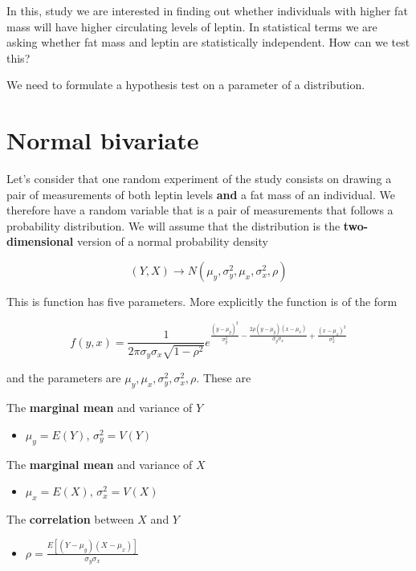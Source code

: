 \documentclass[
]{book}
\providecommand{\tightlist}{%
  \setlength{\itemsep}{0pt}\setlength{\parskip}{0pt}}
\begin{document}
In this, study we are interested in finding out whether individuals with higher fat mass will have higher circulating levels of leptin. In statistical terms we are asking whether fat mass and leptin are statistically independent. How can we test this?

We need to formulate a hypothesis test on a parameter of a distribution.

\hypertarget{normal-bivariate}{%
\section{Normal bivariate}\label{normal-bivariate}}

Let's consider that one random experiment of the study consists on drawing a pair of measurements of both leptin levels \textbf{and} a fat mass of an individual. We therefore have a random variable that is a pair of measurements that follows a probability distribution. We will assume that the distribution is the \textbf{two-dimensional} version of a normal probability density

\[(Y, X) \rightarrow N(\mu_y, \sigma^2_y, \mu_x, \sigma^2_x, \rho)\]

This is function has five parameters. More explicitly the function is of the form

\[f(y,x)=\frac{1}{2\pi \sigma_y\sigma_x \sqrt{1-\rho^2}}e^{\frac{(y-\mu_y)^2}{\sigma_y^2}-\frac{2\rho(y-\mu_y)(x-\mu_x)}{\sigma_y\sigma_x}+\frac{(x-\mu_x)^2}{\sigma_x^2}}\]

and the parameters are \(\mu_y, \mu_x, \sigma^2_y, \sigma_x^2, \rho\). These are

The \textbf{marginal mean} and variance of \(Y\)

\begin{itemize}
\tightlist
\item
  \(\mu_y=E(Y)\), \(\sigma^2_y=V(Y)\)
\end{itemize}

The \textbf{marginal mean} and variance of \(X\)

\begin{itemize}
\tightlist
\item
  \(\mu_x=E(X)\), \(\sigma^2_x=V(X)\)
\end{itemize}

The \textbf{correlation} between \(X\) and \(Y\)

\begin{itemize}
\tightlist
\item
  \(\rho=\frac{E[(Y-\mu_y)(X-\mu_x)]}{\sigma_y\sigma_x}\)
\end{itemize}
\end{document}
